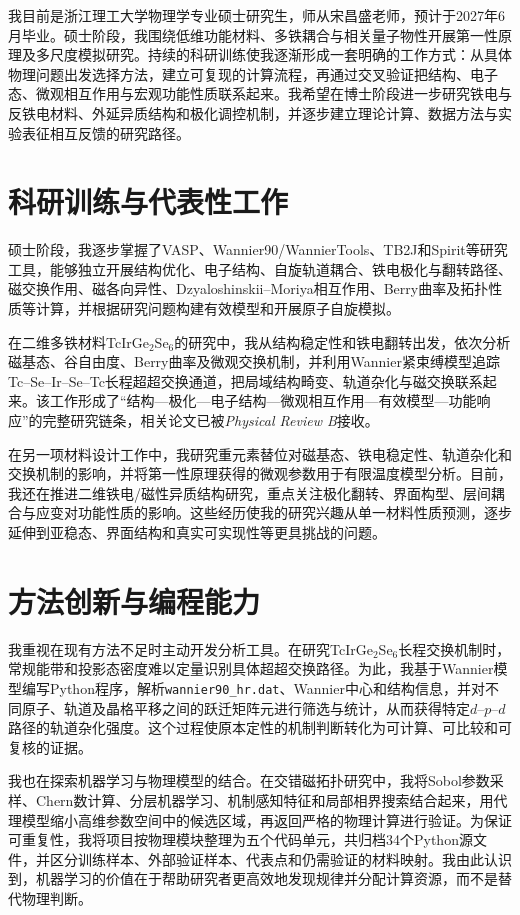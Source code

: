 我目前是浙江理工大学物理学专业硕士研究生，师从宋昌盛老师，预计于2027年6月毕业。硕士阶段，我围绕低维功能材料、多铁耦合与相关量子物性开展第一性原理及多尺度模拟研究。持续的科研训练使我逐渐形成一套明确的工作方式：从具体物理问题出发选择方法，建立可复现的计算流程，再通过交叉验证把结构、电子态、微观相互作用与宏观功能性质联系起来。我希望在博士阶段进一步研究铁电与反铁电材料、外延异质结构和极化调控机制，并逐步建立理论计算、数据方法与实验表征相互反馈的研究路径。

\section{科研训练与代表性工作}

硕士阶段，我逐步掌握了VASP、Wannier90/WannierTools、TB2J和Spirit等研究工具，能够独立开展结构优化、电子结构、自旋轨道耦合、铁电极化与翻转路径、磁交换作用、磁各向异性、Dzyaloshinskii--Moriya相互作用、Berry曲率及拓扑性质等计算，并根据研究问题构建有效模型和开展原子自旋模拟。

在二维多铁材料TcIrGe$_2$Se$_6$的研究中，我从结构稳定性和铁电翻转出发，依次分析磁基态、谷自由度、Berry曲率及微观交换机制，并利用Wannier紧束缚模型追踪Tc--Se--Ir--Se--Tc长程超超交换通道，把局域结构畸变、轨道杂化与磁交换联系起来。该工作形成了“结构—极化—电子结构—微观相互作用—有效模型—功能响应”的完整研究链条，相关论文已被\textit{Physical Review B}接收。

在另一项材料设计工作中，我研究重元素替位对磁基态、铁电稳定性、轨道杂化和交换机制的影响，并将第一性原理获得的微观参数用于有限温度模型分析。目前，我还在推进二维铁电/磁性异质结构研究，重点关注极化翻转、界面构型、层间耦合与应变对功能性质的影响。这些经历使我的研究兴趣从单一材料性质预测，逐步延伸到亚稳态、界面结构和真实可实现性等更具挑战的问题。

\section{方法创新与编程能力}

我重视在现有方法不足时主动开发分析工具。在研究TcIrGe$_2$Se$_6$长程交换机制时，常规能带和投影态密度难以定量识别具体超超交换路径。为此，我基于Wannier模型编写Python程序，解析\texttt{wannier90\_hr.dat}、Wannier中心和结构信息，并对不同原子、轨道及晶格平移之间的跃迁矩阵元进行筛选与统计，从而获得特定$d$--$p$--$d$路径的轨道杂化强度。这个过程使原本定性的机制判断转化为可计算、可比较和可复核的证据。

我也在探索机器学习与物理模型的结合。在交错磁拓扑研究中，我将Sobol参数采样、Chern数计算、分层机器学习、机制感知特征和局部相界搜索结合起来，用代理模型缩小高维参数空间中的候选区域，再返回严格的物理计算进行验证。为保证可重复性，我将项目按物理模块整理为五个代码单元，共归档34个Python源文件，并区分训练样本、外部验证样本、代表点和仍需验证的材料映射。我由此认识到，机器学习的价值在于帮助研究者更高效地发现规律并分配计算资源，而不是替代物理判断。

